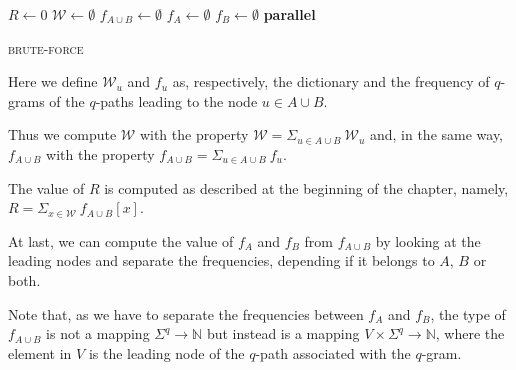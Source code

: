 \begin{algorithm}[h]
	\small
	\DontPrintSemicolon
	\BlankLine
	$R \gets 0$\;
	$\mathcal{W} \gets \emptyset$\;
	$f_{A \cup B} \gets \emptyset$ \quad \;    
	$f_{A} \gets \emptyset$\; 
	$f_{B} \gets \emptyset$\; 
	\BlankLine
	\textbf{parallel} 
	\BlankLine    
	\BlankLine
	\caption{\textsc{brute-force}}
	\label{alg:brute-force}
\end{algorithm}

Here we define $\mathcal{W}_{u}$ and $f_{u}$ as, respectively, the dictionary and the frequency of $q$-grams of the $q$-paths leading to the node $u \in A \cup B$.
	 
Thus we compute $\mathcal{W}$ with the property $\mathcal{W} = \Sigma_{u \in A \cup B}{\ \mathcal{W}_{u} }$ and, in the same way, $f_{A \cup B}$ with the property $f_{A \cup B} = \Sigma_{u \in A \cup B}{\ f_{u} }$.
	
The value of $R$ is computed as described at the beginning of the chapter, namely, $R = \Sigma_{x \in \mathcal{W} }{\ f_{A \cup B}[x] }$.

At last, we can compute the value of $f_{A}$ and $f_{B}$ from $f_{A \cup B}$ by looking at the leading nodes and separate the frequencies, depending if it belongs to $A$, $B$ or both.

Note that, as we have to separate the frequencies between $f_{A}$ and $f_{B}$, the type of $f_{A \cup B}$ is not a mapping $ \Sigma^{q} \rightarrow \mathbb{N}$ but instead is a mapping $V \times \Sigma^{q} \rightarrow \mathbb{N}$, where the element in $V$ is the leading node of the $q$-path associated with the $q$-gram.\medskip
	
